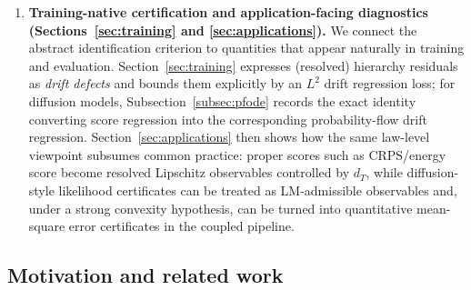 \documentclass{article}
\numberwithin{equation}{section}
\theoremstyle{plain}
\theoremstyle{definition}
\theoremstyle{remark}
\begin{document}
\begin{enumerate}[label=\textbf{(\Roman*)},leftmargin=2.4em]
\item \textbf{Training-native certification and application-facing diagnostics (Sections~\ref{sec:training} and \ref{sec:applications}).}
We connect the abstract identification criterion to quantities that appear naturally in training and evaluation.
Section~\ref{sec:training} expresses (resolved) hierarchy residuals as \emph{drift defects} and bounds them explicitly by an
$L^2$ drift regression loss; for diffusion models, Subsection~\ref{subsec:pfode} records the exact identity converting score
regression into the corresponding probability-flow drift regression.
Section~\ref{sec:applications} then shows how the same law-level viewpoint subsumes common practice:
proper scores such as CRPS/energy score become resolved Lipschitz observables controlled by $d_T$, while diffusion-style
likelihood certificates can be treated as LM-admissible observables and, under a strong convexity hypothesis, can be turned
into quantitative mean-square error certificates in the coupled pipeline.
\end{enumerate}





\subsection{Motivation and related work}
\end{document}
